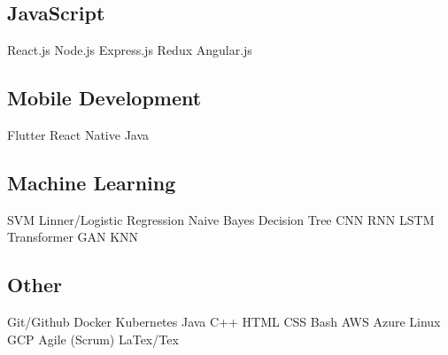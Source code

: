 \documentclass[]{deedy-resume-openfont}
\begin{document}
\begin{minipage}[t]{0.33\textwidth}
\vspace{8pt}

\subsection{JavaScript}
\location{}
React.js \textbullet{} Node.js \textbullet{} Express.js \textbullet{}
Redux \textbullet{} Angular.js \textbullet{} 

\vspace{8pt}

\subsection{Mobile Development}
\location{}
Flutter \textbullet{} React Native \textbullet{} Java \textbullet{} 

\vspace{8pt}

\subsection{Machine Learning}
\location{}
SVM \textbullet{} Linner/Logistic Regression \textbullet{} Naive Bayes \textbullet{} 
Decision Tree \textbullet{} CNN \textbullet{} RNN \textbullet{} LSTM \textbullet{} 
Transformer \textbullet{} GAN \textbullet{} KNN 

\vspace{8pt}

\subsection{Other}
\location{}
Git/Github \textbullet{} Docker \textbullet{} Kubernetes \textbullet{}
Java \textbullet{} C++ \textbullet{} HTML \textbullet{} CSS \textbullet{} Bash \textbullet{}
AWS \textbullet{} Azure \textbullet{} Linux \textbullet{} GCP \textbullet{} 
Agile (Scrum) \textbullet{} LaTex/Tex

\vspace{8pt}




\end{minipage}
\end{document}
